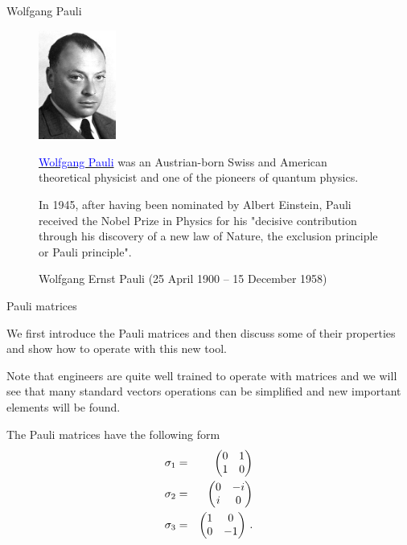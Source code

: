 \documentclass[10pt]{beamer}
\begin{document}
 
\begin{frame}[shrink=10]{Wolfgang Pauli}
\begin{figure}[htb]

\begin{center}
\includegraphics[width=1.0in]{220px-Pauli}
\end{center}

\caption{
Wolfgang Ernst Pauli (25 April 1900 -- 15 December 1958)
}

\href{https://en.wikipedia.org/wiki/Wolfgang_Pauli}{\textcolor{blue}{Wolfgang Pauli}} was an Austrian-born Swiss and American theoretical physicist and one of the pioneers of quantum physics. 

In 1945, after having been nominated by Albert Einstein, Pauli received the Nobel Prize in Physics for his "decisive contribution through his discovery of a new law of Nature, the exclusion principle or Pauli principle". 

\end{figure}

\end{frame}


\begin{frame}[fragile]{Pauli matrices}



We first introduce the Pauli matrices and then discuss some of their properties and show how to operate with this new tool.

Note that \alert{engineers are quite well trained to operate with matrices} and we will see that many standard vectors operations can be simplified and new important elements will be found.

 
  The Pauli matrices have the following form
%
\begin{eqnarray}
\sigma_1 &= & \begin{pmatrix}0 & 1\cr 1 & 0\end{pmatrix} \nonumber \\
%
\sigma_2 &= & \begin{pmatrix}0 & -i\cr i & 0\end{pmatrix} \nonumber \\
%
\sigma_3 &= &\begin{pmatrix}1 & 0\cr 0 & -1\end{pmatrix}  \, .
%
\end{eqnarray}
%

\end{frame}
\end{document}
